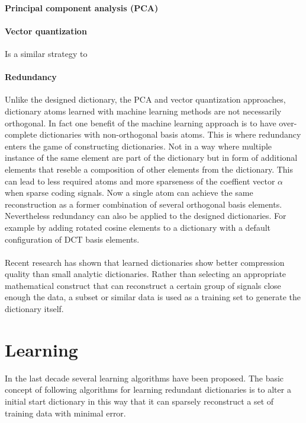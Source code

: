 \paragraph{Principal component analysis (PCA)} 

\paragraph{Vector quantization} Is a similar strategy to


\paragraph{Redundancy} Unlike the designed dictionary, the PCA and
vector quantization approaches, dictionary atoms learned with machine learning
methods are not necessarily orthogonal. In fact one benefit of the machine
learning approach is to have over-complete dictionaries with non-orthogonal
basis atoms. This is where redundancy enters the game of constructing
dictionaries. Not in a way where multiple instance of the same element are part
of the dictionary but in form of additional elements that reseble a composition
of other elements from the dictionary. This can lead to less required atoms and
more sparseness of the coeffient vector $\alpha$ when sparse coding signals.
Now a single atom can achieve the same reconstruction as a former combination of
several orthogonal basis elements. Nevertheless redundancy can also be applied
to the designed dictionaries. For example by adding rotated cosine elements to a
dictionary with a default configuration of DCT basis elements.


\paragraph{}
Recent research\cite{Chen1998,Aharon2006,Mairal2010} has shown that learned
dictionaries show better compression quality than small analytic
dictionaries. Rather than selecting an appropriate mathematical construct that
can reconstruct a certain group of signals close enough the data, a subset or
similar data is used as a training set to generate the dictionary itself.



\section{Learning}
\cite{Olshausen1997,Lewicki2000,Aharon2006}
In the last decade several learning algorithms have been proposed. The basic
concept of following algorithms for learning redundant dictionaries is to alter
a initial start dictionary in this way that it can sparsely reconstruct a set of
training data with minimal error. 

